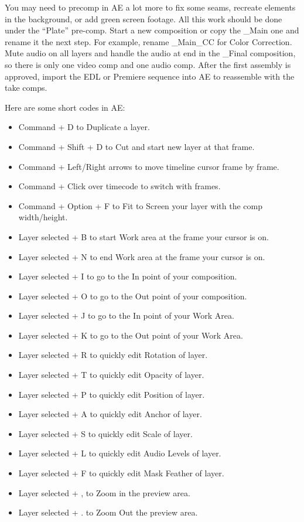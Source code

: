 \begin{fullwidth}
You may need to precomp in AE a lot more to fix some seams, recreate elements in the background, or add green screen footage. All this work should be done under the “Plate” pre-comp. Start a new composition or copy the \_Main one and rename it the next step. For example, rename \_Main\_CC for Color Correction. Mute audio on all layers and handle the audio at end in the \_Final composition, so there is only one video comp and one audio comp. After the first assembly is approved, import the EDL or Premiere sequence into AE to reassemble with the take comps.

\clearpage
Here are some short codes in AE:

\begin{itemize}
\item Command + D to Duplicate a layer.
\item Command + Shift + D to Cut and start new layer at that frame.
\item Command + Left/Right arrows to move timeline cursor frame by frame.
\item Command + Click over timecode to switch with frames.
\item Command + Option + F to Fit to Screen your layer with the comp width/height.
\item Layer selected + B to start Work area at the frame your cursor is on.
\item Layer selected + N to end Work area at the frame your cursor is on.
\item Layer selected + I to go to the In point of your composition.
\item Layer selected + O to go to the Out point of your composition.
\item Layer selected + J to go to the In point of your Work Area.
\item Layer selected + K to go to the Out point of your Work Area.
\item Layer selected + R to quickly edit Rotation of layer.
\item Layer selected + T to quickly edit Opacity of layer.
\item Layer selected + P to quickly edit Position of layer.
\item Layer selected + A to quickly edit Anchor of layer.
\item Layer selected + S to quickly edit Scale of layer.
\item Layer selected + L to quickly edit Audio Levels of layer.
\item Layer selected + F to quickly edit Mask Feather of layer.
\item Layer selected + , to Zoom in the preview area.
\item Layer selected + . to Zoom Out the preview area.
\end{itemize}

\clearpage
\end{fullwidth}